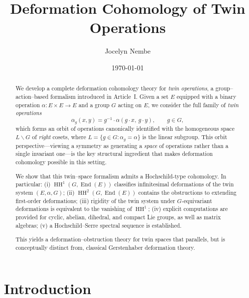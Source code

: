 \documentclass[11pt,a4paper]{article}
\title{\textbf{Deformation Cohomology of Twin Operations}}
\author{Jocelyn Nembe}
\date{\today}
\numberwithin{equation}{section}
\DeclareMathOperator{\End}{End}
\DeclareMathOperator{\HH}{HH}
\newcommand{\TwinSpace}{(E,\alpha,G)}
\newcommand{\LinearSubgroup}{L}
\begin{document}
	
	\maketitle
	
	\begin{abstract}
		We develop a complete deformation cohomology theory for \emph{twin operations},
		a group--action--based formalism introduced in Article~I.
		Given a set $E$ equipped with a binary operation $\alpha : E\times E \to E$
		and a group $G$ acting on $E$, we consider the full family of 
		\emph{twin operations}
		\[
		\alpha_g(x,y) = g^{-1}\cdot \alpha(g\cdot x,\ g\cdot y), \qquad g\in G,
		\]
		which forms an orbit of operations canonically identified with the homogeneous space $\LinearSubgroup\backslash G$ of \emph{right} cosets,
		where $\LinearSubgroup=\{g\in G : \alpha_g=\alpha\}$ is the linear subgroup.
		This orbit perspective---viewing a symmetry as generating a \emph{space} of operations rather than a single invariant one---is the key structural ingredient that makes deformation cohomology possible in this setting.
		
		We show that this twin--space formalism admits a Hochschild-type cohomology.
		In particular:
		(i) $\HH^1(G,\End(E))$ classifies infinitesimal deformations of the twin system $\TwinSpace$;
		(ii) $\HH^2(G,\End(E))$ contains the obstructions to extending first-order deformations;
		(iii) rigidity of the twin system under $G$-equivariant deformations is equivalent to the vanishing of $\HH^1$;
		(iv) explicit computations are provided for cyclic, abelian, dihedral, and compact Lie groups, as well as matrix algebras;
		(v) a Hochschild--Serre spectral sequence is established.
		
		This yields a deformation--obstruction theory for twin spaces that parallels, but is conceptually distinct from, classical Gerstenhaber deformation theory.
	\end{abstract}
	
	\tableofcontents
	
	\section{Introduction}
	\label{sec:intro}
	
\end{document}
